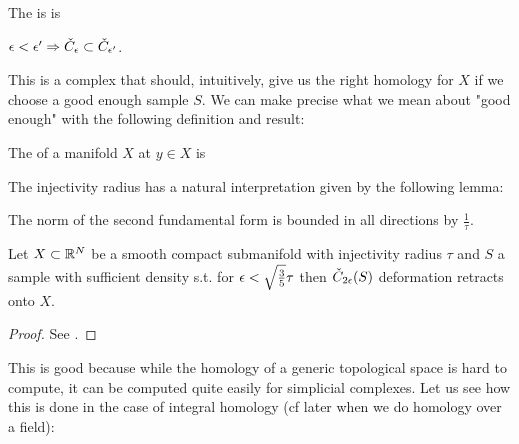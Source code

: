 \documentclass{article}
\begin{document}
\begin{definition}
	The  is is 
\end{definition}

\begin{lemma}
	$\epsilon < \epsilon^\prime \Rightarrow \check{C}_\epsilon \subset \check{C}_{\epsilon^\prime}$. 
\end{lemma}

This is a complex that should, intuitively, give us the right homology for $X$ if we choose a good enough sample $S$. We can make precise what we mean about "good enough" with the following definition and result:

\begin{definition}
	The  of a manifold $X$ at $y \in X$ is 
\end{definition}

The injectivity radius has a natural interpretation given by the following lemma:

\begin{lemma}
	The norm of the second fundamental form is bounded in all directions by $\frac{1}{\tau}$.
\end{lemma}

\begin{theorem}
	Let $X\subset \mathbb{R}^N$ be a smooth compact submanifold with injectivity radius $\tau$ and $S$ a sample with sufficient density s.t. 
for $\epsilon < \sqrt{\frac{3}{5}}\tau$ then $\check{C}_{2\epsilon}(S)$ deformation retracts onto $X$. 
\end{theorem}
\begin{proof}
	See \cite{Niyogi2008}.
\end{proof}

This is good because while the homology of a generic topological space is hard to compute, it can be computed quite easily for simplicial complexes. Let us see how this is done in the case of integral homology (cf later when we do homology over a field):
\vspace{3mm}
\end{document}
